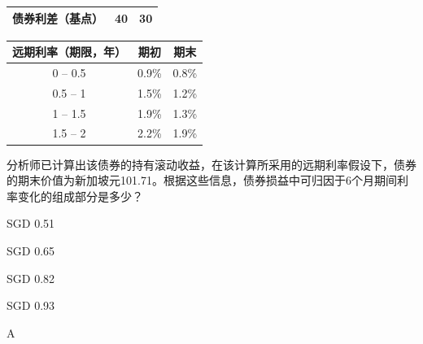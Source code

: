 \documentclass{article}
\newcounter{question} %
\begin{document}
\begin{question}
\begin{center}
\begin{tabular}{|c|c|c|}
    \hline
    债券利差（基点） & 40 & 30 \\
    \hline
    \end{tabular}
    \end{center}
    \begin{center}
    \begin{tabular}{|c|c|c|}
    \hline
    远期利率（期限，年） & 期初 & 期末 \\
    \hline
    0 – 0.5 & 0.9\% & 0.8\% \\
    \hline
    0.5 – 1 & 1.5\% & 1.2\% \\
    \hline
    1 – 1.5 & 1.9\% & 1.3\% \\
    \hline
    1.5 – 2 & 2.2\% & 1.9\% \\
    \hline
    \end{tabular}
    \end{center}
    分析师已计算出该债券的持有滚动收益，在该计算所采用的远期利率假设下，债券的期末价值为新加坡元101.71。根据这些信息，债券损益中可归因于6个月期间利率变化的组成部分是多少？
    \end{question}
    
    \begin{choices}
        \item SGD 0.51
        \item SGD 0.65
        \item SGD 0.82
        \item SGD 0.93
    \end{choices}
    
    \begin{correctanswer}
        A
    \end{correctanswer}
    
\end{document}
